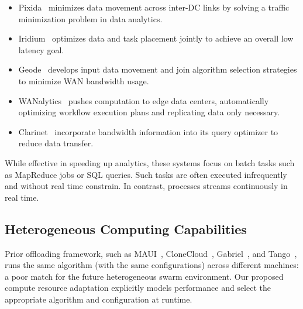 \documentclass[thesis.tex]{subfiles}
\begin{document}
\begin{itemize}[topsep=5pt, leftmargin=14pt, itemsep=2pt]

\item Pixida~\cite{kloudas2015pixida} minimizes data movement across inter-DC
  links by solving a traffic minimization problem in data analytics.

\item Iridium~\cite{pu2015low} optimizes data and task placement jointly to
  achieve an overall low latency goal.

\item Geode~\cite{vulimiri2015global} develops input data movement and join
  algorithm selection strategies to minimize WAN bandwidth usage.

\item WANalytics~\cite{vulimiri2015wananlytics} pushes computation to edge data
  centers, automatically optimizing workflow execution plans and replicating
  data only necessary.

\item Clarinet~\cite{viswanathan2016clarinet} incorporate bandwidth information
  into its query optimizer to reduce data transfer.


\end{itemize}

While effective in speeding up analytics, these systems focus on batch tasks
such as MapReduce jobs or SQL queries. Such tasks are often executed
infrequently and without real time constrain. In contrast, \sysname{} processes
streams continuously in real time.

\subsection{Heterogeneous Computing Capabilities}
\label{sec:heter-proc-capab}

Prior offloading framework, such as MAUI~\cite{cuervo2010maui},
CloneCloud~\cite{chun2011clonecloud}, Gabriel~\cite{ha2014towards}, and
Tango~\cite{gordon2015accelerating}, runs the same algorithm (with the same
configurations) across different machines: a poor match for the future
heterogeneous swarm environment. Our proposed compute resource adaptation
explicitly models performance and select the appropriate algorithm and
configuration at runtime.
\end{document}
